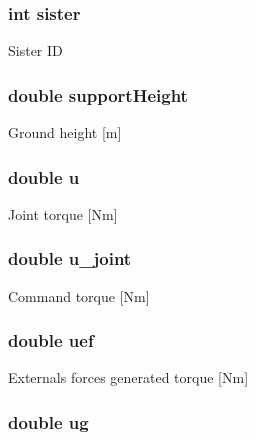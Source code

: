 \hypertarget{struct_stu_l_i_n_k_a4be648b61310876c0a259d5015b8ac80}{
\subsubsection[{sister}]{\setlength{\rightskip}{0pt plus 5cm}int sister}}\label{struct_stu_l_i_n_k_a4be648b61310876c0a259d5015b8ac80}
Sister I\-D \hypertarget{struct_stu_l_i_n_k_a1c3353d1177251d7c4a501ecf9f1a173}{
\subsubsection[{support\-Height}]{\setlength{\rightskip}{0pt plus 5cm}double support\-Height}}\label{struct_stu_l_i_n_k_a1c3353d1177251d7c4a501ecf9f1a173}
Ground height \mbox{[}m\mbox{]} \hypertarget{struct_stu_l_i_n_k_aed08c8478a62910aab06ba708a0e5b5f}{
\subsubsection[{u}]{\setlength{\rightskip}{0pt plus 5cm}double u}}\label{struct_stu_l_i_n_k_aed08c8478a62910aab06ba708a0e5b5f}
Joint torque \mbox{[}Nm\mbox{]} \hypertarget{struct_stu_l_i_n_k_a4c825b6298857a29278ccd8a7b731863}{
\subsubsection[{u\-\_\-joint}]{\setlength{\rightskip}{0pt plus 5cm}double u\-\_\-joint}}\label{struct_stu_l_i_n_k_a4c825b6298857a29278ccd8a7b731863}
Command torque \mbox{[}Nm\mbox{]} \hypertarget{struct_stu_l_i_n_k_a48e660e5c4e92e6b18ac669bf27e5972}{
\subsubsection[{uef}]{\setlength{\rightskip}{0pt plus 5cm}double uef}}\label{struct_stu_l_i_n_k_a48e660e5c4e92e6b18ac669bf27e5972}
Externals forces generated torque \mbox{[}Nm\mbox{]} \hypertarget{struct_stu_l_i_n_k_a26599157c0b45c8f13eb679ca9a2a491}{
\subsubsection[{ug}]{\setlength{\rightskip}{0pt plus 5cm}double ug}}\label{struct_stu_l_i_n_k_a26599157c0b45c8f13eb679ca9a2a491}
